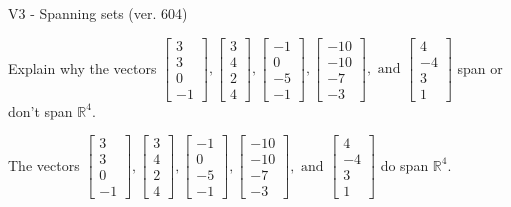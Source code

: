 \begin{exercise}
  \begin{exerciseTitle}V3 - Spanning sets (ver. 604)\end{exerciseTitle}
  \begin{exerciseStatement}
    Explain why the vectors \(\left[\begin{array}{r}
3 \\
3 \\
0 \\
-1
\end{array}\right] , \left[\begin{array}{r}
3 \\
4 \\
2 \\
4
\end{array}\right] , \left[\begin{array}{r}
-1 \\
0 \\
-5 \\
-1
\end{array}\right] , \left[\begin{array}{r}
-10 \\
-10 \\
-7 \\
-3
\end{array}\right] , \text{ and } \left[\begin{array}{r}
4 \\
-4 \\
3 \\
1
\end{array}\right]\) span or don't span \(\mathbb{R}^4\). 
	


  \end{exerciseStatement}
  \begin{exerciseAnswer}
   The vectors \(\left[\begin{array}{r}
3 \\
3 \\
0 \\
-1
\end{array}\right] , \left[\begin{array}{r}
3 \\
4 \\
2 \\
4
\end{array}\right] , \left[\begin{array}{r}
-1 \\
0 \\
-5 \\
-1
\end{array}\right] , \left[\begin{array}{r}
-10 \\
-10 \\
-7 \\
-3
\end{array}\right] , \text{ and } \left[\begin{array}{r}
4 \\
-4 \\
3 \\
1
\end{array}\right]\) 
  	 do  
	span \(\mathbb{R}^4\).
  



\end{exerciseAnswer}
\end{exercise}

